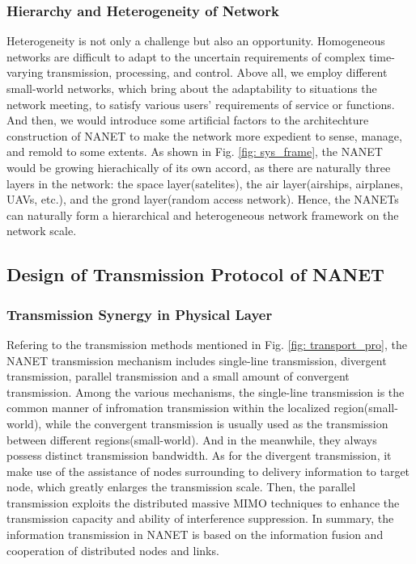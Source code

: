 \documentclass[journal,comsoc]{IEEEtran}
\begin{document}
			\subsubsection{Hierarchy and Heterogeneity of Network}
				Heterogeneity is not only a challenge but also an opportunity. 
				Homogeneous networks are difficult to adapt to the uncertain requirements of complex time-varying transmission, processing, and control.
				Above all, we employ different small-world networks, which bring about the adaptability to situations the network meeting, to satisfy various users' requirements of service or functions.	
				And then, we would introduce some artificial factors to the architechture construction of NANET to make the network more expedient to sense, manage, and remold to some extents.
				As shown in Fig. \ref{fig: sys_frame}, the NANET would be growing hierachically of its own accord, 
				as there are naturally three layers in the network: the space layer(satelites), the air layer(airships, airplanes, UAVs, etc.), and the grond layer(random access network).
				Hence, the NANETs can naturally form a hierarchical and heterogeneous network framework on the network scale.
		
		\subsection{Design of Transmission Protocol of NANET}
		
			\subsubsection{Transmission Synergy in Physical Layer}
				Refering to the transmission methods mentioned in Fig. \ref{fig: transport_pro}, the NANET transmission mechanism includes single-line transmission, divergent transmission, parallel transmission and a small amount of convergent transmission.
				Among the various mechanisms, the single-line transmission is the common manner of infromation transmission within the localized region(small-world), while the convergent transmission is usually used as the transmission between different regions(small-world). 
				And in the meanwhile, they always possess distinct transmission bandwidth. 
				As for the divergent transmission, it make use of the assistance of nodes surrounding to delivery information to target node, which greatly enlarges the transmission scale.
				Then, the parallel transmission exploits the distributed massive MIMO techniques to enhance the transmission capacity and ability of interference suppression.
				In summary, the information transmission in NANET is based on the information fusion and cooperation of distributed nodes and links.
\end{document}
